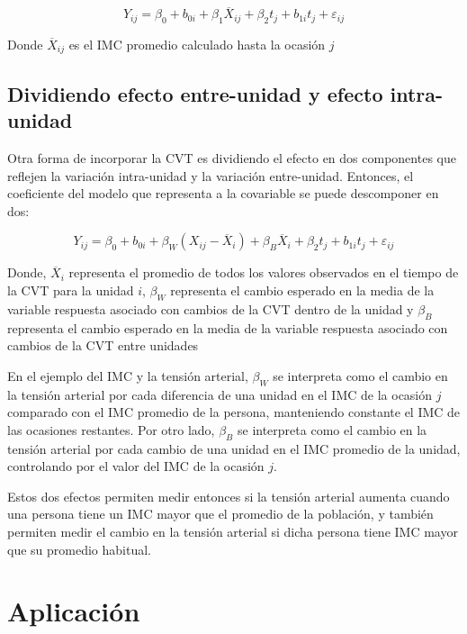 \documentclass[spanish]{article}
\numberwithin{figure}{subsection}
\numberwithin{equation}{subsection}
\numberwithin{table}{subsection}
\begin{document}
\[ Y_{ij} = \beta_0 + b_{0i} + \beta_1 \overline{X}_{ij} + \beta_2 t_j + b_{1i} t_j + \varepsilon_{ij} \]

Donde $\overline{X}_{ij}$ es el IMC promedio calculado hasta la ocasión $j$

\subsection{Dividiendo efecto entre-unidad y efecto intra-unidad}
\label{Dividiendo efecto entre-unidad y efecto intra-unidad}

Otra forma de incorporar la CVT es dividiendo el efecto en dos componentes que
reflejen la variación intra-unidad y la variación entre-unidad. Entonces, el
coeficiente del modelo que representa a la covariable se puede descomponer en
dos:

\[ 
	Y_{ij} = \beta_0 + b_{0i} + \beta_W (X_{ij} - \overline{X}_i) + \beta_B
	\overline{X}_i + \beta_2 t_j + b_{1i} t_j + \varepsilon_{ij}
\]

Donde, $\overline{X}_i$ representa el promedio de todos los valores observados
en el tiempo de la CVT para la unidad $i$, $\beta_W$ representa el cambio
esperado en la media de la variable respuesta asociado con cambios de la CVT
dentro de la unidad y $\beta_B$ representa el cambio esperado en la media de
la variable respuesta asociado con cambios de la CVT entre unidades

En el ejemplo del IMC y la tensión arterial, $\beta_W$ se interpreta como el
cambio en la tensión arterial por cada diferencia de una unidad en el IMC de la
ocasión $j$ comparado con el IMC promedio de la persona, manteniendo constante
el IMC de las ocasiones restantes. Por otro lado, $\beta_B$ se interpreta como
el cambio en la tensión arterial por cada cambio de una unidad en el IMC
promedio de la unidad, controlando por el valor del IMC de la ocasión $j$.

Estos dos efectos permiten medir entonces si la tensión arterial aumenta cuando
una persona tiene un IMC mayor que el promedio de la población, y también
permiten medir el cambio en la tensión arterial si dicha persona tiene IMC mayor
que su promedio habitual.

\newpage

\section{Aplicación}
\end{document}
